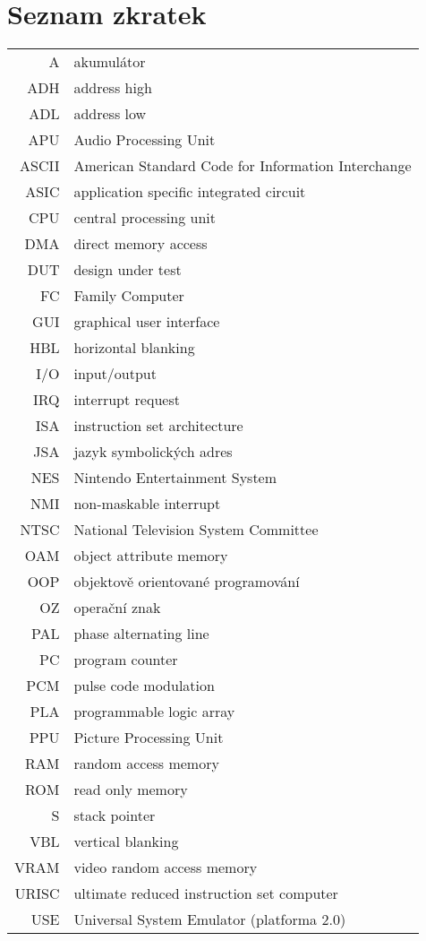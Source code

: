 \documentclass[czech,bachelor,unicode]{ctufit-thesis}
\theoremstyle{plain}
\theoremstyle{definition}
\theoremstyle{remark}
\numberwithin{theorem}{chapter}
\begin{document}
\chapter{Seznam zkratek}
\begin{tabular}{rl}
A 	 & akumulátor \\
ADH &	 address high \\
ADL &	 address low \\
APU &	 Audio Processing Unit\\
ASCII & American Standard Code for Information Interchange \\
ASIC &	 application specific integrated circuit \\
CPU &	 central processing unit\\
DMA & direct memory access \\
DUT & design under test\\
FC &	 Family Computer\\
GUI &	 graphical user interface \\
HBL & horizontal blanking \\
I/O &	 input/output \\
IRQ &	 interrupt request\\
ISA &	 instruction set architecture\\
JSA &	 jazyk symbolických adres\\
NES &	 Nintendo Entertainment System\\
NMI &	 non-maskable interrupt\\
NTSC &	 National Television System Committee\\
OAM &	 object attribute memory\\
OOP &	 objektově orientované programování \\
OZ &	 operační znak \\
PAL &	 phase alternating line\\
PC &	 program counter \\
PCM &    pulse code modulation \\
PLA &	 programmable logic array \\
PPU &	 Picture Processing Unit\\
RAM &	 random access memory\\
ROM &	 read only memory\\
S &	 stack pointer \\
VBL & vertical blanking \\
VRAM &	 video random access memory \\
URISC & ultimate reduced instruction set computer \\
USE & Universal System Emulator (platforma 2.0) \\

\end{tabular}
\end{document}

